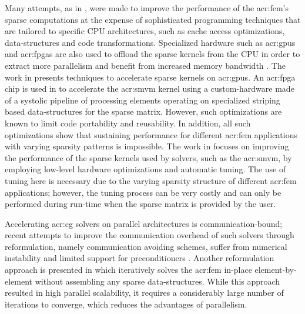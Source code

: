 Many attempts, as in \cite{bib:Demmel2007OODMVMOEMP,bib:im2004sparsity,bib:Demmel2002perfOpt,bib:kourtis2008optimizing,bib:Demmel1994Templates,bib:Bulu2009ParSMVM,bib:mellor2004optimizing,bib:David2010PM,bib:willcock2006accelerating,bib:geus1999towards}, were made to improve the performance of the \gls{acr:fem}'s sparse computations at the expense of sophisticated programming techniques that are tailored to specific CPU architectures, such as cache access optimizations, data-structures and code transformations.
Specialized hardware such as \glspl{acr:gpu} and \glspl{acr:fpga} are also used to offload the sparse kernels from the CPU in order to extract more parallelism and benefit from increased memory bandwidth \cite{bib:shan2010fpga,bib:kestur2012towards,bib:bell2009implementing,bib:sun1999mapping,bib:Zhuo2005SMVMonFPGAs}.
The work in \cite{bib:Mehridehnavi2013CAGPU,bib:Maryam2011GPUCG,bib:Maryam2010GPUSMVM} presents techniques to accelerate sparse kernels on \glspl{acr:gpu}.
An \gls{acr:fpga} chip is used in \cite{bib:elkurdi2007hafem,bib:Elkurdi2006FPGASMVM} to accelerate the \gls{acr:smvm} kernel using a custom-hardware made of a systolic pipeline of processing elements operating on specialized striping based data-structures for the sparse matrix.
However, such optimizations are known to limit code portability and reusability.
In addition, all such optimizations show that sustaining performance for different \gls{acr:fem} applications with varying sparsity patterns is impossible.
The work in \cite{bib:DemmelOSKI} focuses on improving the performance of the sparse kernels used by solvers, such as the \gls{acr:smvm}, by employing low-level hardware optimizations and automatic tuning. 
The use of tuning here is necessary due to the varying sparsity structure of different \gls{acr:fem} applications; however, the tuning process can be very costly and can only be performed during run-time when the sparse matrix is provided by the user.


Accelerating \gls{acr:cg} solvers on parallel architectures is communication-bound; recent attempts to improve the communication overhead of such solvers through reformulation, namely communication avoiding schemes, suffer from numerical instability and limited support for preconditioners \cite{bib:Hoemmen2010EECS}.
Another reformulation approach is presented in \cite{bib:David2012FEMSES} which iteratively solves the \gls{acr:fem} in-place element-by-element without assembling any sparse data-structures.  While this approach resulted in high parallel scalability, it requires a considerably large number of iterations to converge, which reduces the advantages of parallelism.  



